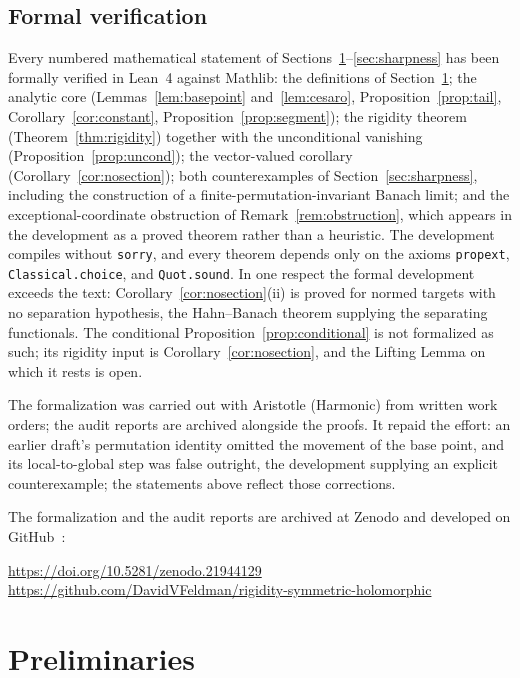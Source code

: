 \documentclass[11pt]{amsart}
\theoremstyle{plain}
\theoremstyle{definition}
\theoremstyle{remark}
\begin{document}
\subsection*{Formal verification}
Every numbered mathematical statement of
Sections~\ref{sec:prelim}--\ref{sec:sharpness} has been formally verified in
Lean~4 against Mathlib: the definitions of Section~\ref{sec:prelim}; the
analytic core (Lemmas~\ref{lem:basepoint} and~\ref{lem:cesaro},
Proposition~\ref{prop:tail}, Corollary~\ref{cor:constant},
Proposition~\ref{prop:segment}); the rigidity theorem
(Theorem~\ref{thm:rigidity}) together with the unconditional vanishing
(Proposition~\ref{prop:uncond}); the vector-valued corollary
(Corollary~\ref{cor:nosection}); both counterexamples of
Section~\ref{sec:sharpness}, including the construction of a
finite-permutation-invariant Banach limit; and the exceptional-coordinate
obstruction of Remark~\ref{rem:obstruction}, which appears in the development
as a proved theorem rather than a heuristic. The development compiles without
\texttt{sorry}, and every theorem depends only on the axioms
\texttt{propext}, \texttt{Classical.choice}, and \texttt{Quot.sound}. In one
respect the formal development exceeds the text:
Corollary~\ref{cor:nosection}(ii) is proved for normed targets with no
separation hypothesis, the Hahn--Banach theorem supplying the separating
functionals. The conditional Proposition~\ref{prop:conditional} is not
formalized as such; its rigidity input is Corollary~\ref{cor:nosection}, and
the Lifting Lemma on which it rests is open.

The formalization was carried out with Aristotle (Harmonic) from written work
orders; the audit reports are archived alongside the proofs. It repaid the effort: an earlier
draft's permutation identity omitted the movement of the base point, and its
local-to-global step was false outright, the development supplying an
explicit counterexample; the statements above reflect those corrections.

The formalization and the audit reports are archived at Zenodo and developed
on GitHub~\cite{Repo}:
\begin{center}
\url{https://doi.org/10.5281/zenodo.21944129}\\
\url{https://github.com/DavidVFeldman/rigidity-symmetric-holomorphic}
\end{center}

\section{Preliminaries}
\label{sec:prelim}
\end{document}
